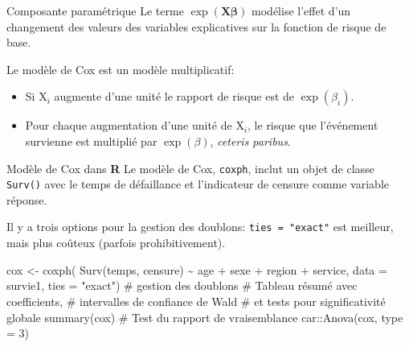 \documentclass[
  ignorenonframetext,
]{beamer}
\newenvironment{Shaded}{\begin{snugshade}}{\end{snugshade}}
\newcommand{\AttributeTok}[1]{\textcolor[rgb]{0.40,0.45,0.13}{#1}}
\newcommand{\CommentTok}[1]{\textcolor[rgb]{0.37,0.37,0.37}{#1}}
\newcommand{\DecValTok}[1]{\textcolor[rgb]{0.68,0.00,0.00}{#1}}
\newcommand{\FunctionTok}[1]{\textcolor[rgb]{0.28,0.35,0.67}{#1}}
\newcommand{\NormalTok}[1]{\textcolor[rgb]{0.00,0.23,0.31}{#1}}
\newcommand{\OtherTok}[1]{\textcolor[rgb]{0.00,0.23,0.31}{#1}}
\newcommand{\SpecialCharTok}[1]{\textcolor[rgb]{0.37,0.37,0.37}{#1}}
\newcommand{\StringTok}[1]{\textcolor[rgb]{0.13,0.47,0.30}{#1}}
\providecommand{\tightlist}{%
  \setlength{\itemsep}{0pt}\setlength{\parskip}{0pt}}
\begin{document}
\begin{frame}{Composante paramétrique}
\protect{}\label{composante-paramuxe9trique}
Le terme \(\exp(\mathbf{X}\boldsymbol{\beta})\) modélise l'effet d'un
changement des valeurs des variables explicatives sur la fonction de
risque de base.

Le modèle de Cox est un modèle multiplicatif:

\begin{itemize}
\tightlist
\item
  Si \(\mathrm{X}_i\) augmente d'une unité le rapport de risque est de
  \(\exp(\beta_i)\).
\item
  Pour chaque augmentation d'une unité de \(\mathrm{X}_i\), le risque
  que l'événement survienne est multiplié par \(\exp(\beta)\),
  \emph{ceteris paribus}.
\end{itemize}
\end{frame}

\begin{frame}[fragile]{Modèle de Cox dans \textbf{R}}
\protect{}\label{moduxe8le-de-cox-dans-r}
Le modèle de Cox, \texttt{coxph}, inclut un objet de classe
\texttt{Surv()} avec le temps de défaillance et l'indicateur de censure
comme variable réponse.

Il y a trois options pour la gestion des doublons:
\texttt{ties\ =\ "exact"} est meilleur, mais plus coûteux (parfois
prohibitivement).

\begin{Shaded}
\begin{Highlighting}[numbers=left,,]
\NormalTok{cox }\OtherTok{\textless{}{-}} \FunctionTok{coxph}\NormalTok{(}
  \FunctionTok{Surv}\NormalTok{(temps, censure) }\SpecialCharTok{\textasciitilde{}} 
\NormalTok{    age }\SpecialCharTok{+}\NormalTok{ sexe }\SpecialCharTok{+}\NormalTok{ region }\SpecialCharTok{+}\NormalTok{ service, }
  \AttributeTok{data =}\NormalTok{ survie1,}
  \AttributeTok{ties =} \StringTok{"exact"}\NormalTok{) }\CommentTok{\# gestion des doublons}
\CommentTok{\# Tableau résumé avec coefficients,}
\CommentTok{\# intervalles de confiance de Wald}
\CommentTok{\# et tests pour significativité globale}
\FunctionTok{summary}\NormalTok{(cox)}
\CommentTok{\# Test du rapport de vraisemblance}
\NormalTok{car}\SpecialCharTok{::}\FunctionTok{Anova}\NormalTok{(cox, }\AttributeTok{type =} \DecValTok{3}\NormalTok{)}
\end{Highlighting}
\end{Shaded}
\end{frame}
\end{document}
